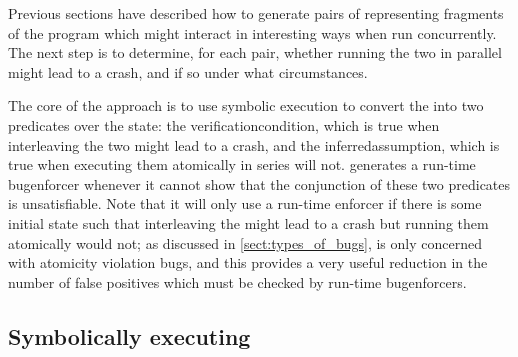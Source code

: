 Previous sections have described how to generate pairs of
{\StateMachines} representing fragments of the program which might
interact in interesting ways when run concurrently.  The next step is
to determine, for each pair, whether running the two {\StateMachines}
in parallel might lead to a crash, and if so under what circumstances.

The core of the approach is to use symbolic execution\cite{King1976}
to convert the {\StateMachines} into two predicates over the
{\StateMachine} state: the \gls{verificationcondition}, which is true
when interleaving the two {\StateMachines} might lead to a crash, and
the \gls{inferredassumption}, which is true when executing them
atomically in series will not.  {\Technique} generates a run-time
\gls{bugenforcer} whenever it cannot show that the conjunction of
these two predicates is unsatisfiable.  Note that it will only use a
run-time enforcer if there is some initial state such that
interleaving the {\StateMachines} might lead to a crash but running
them atomically would not; as discussed in
\autoref{sect:types_of_bugs}, {\technique} is only concerned with
atomicity violation bugs, and this provides a very useful reduction in
the number of false positives which must be checked by run-time
\glspl{bugenforcer}.

\subsection{Symbolically executing {\StateMachines}}
\label{sect:derive:symbolic_execute}

